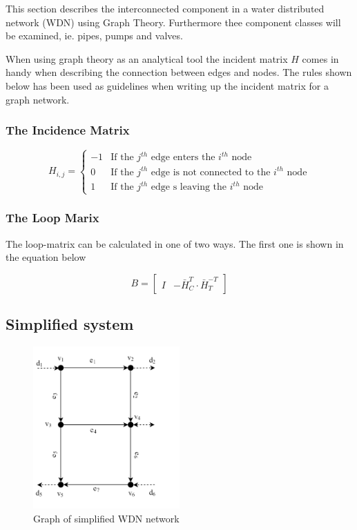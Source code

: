 This section describes the interconnected component in a water distributed network (WDN) using Graph Theory. Furthermore thee component classes will be examined, ie. pipes, pumps and valves.

When using graph theory as an analytical tool the incident matrix $H$ comes in handy when describing the connection between edges and nodes. The rules shown below has been used as guidelines when writing up the incident matrix for a graph network. 

\subsubsection{The Incidence Matrix}
\begin{equation*}
	H_{i,j} = \begin{cases}
		-1 & \text{If the $j^{th}$ edge enters the $i^{th}$ node} \\
		0 & \text{If the $j^{th}$ edge is not connected to the $i^{th}$ node} \\
		1 & \text{If the $j^{th}$ edge s leaving the $i^{th}$ node}
	\end{cases}
\end{equation*} %

\subsubsection{The Loop Marix}
The loop-matrix can be calculated in one of two ways. The first one is shown in the equation below

\begin{equation} \label{eq:LoopMatrix}
	B = \begin{bmatrix}
		I & -\bar{H}_{C}^{T}\cdot\bar{H}_{T}^{-T}
	\end{bmatrix}
\end{equation}


\newpage
\subsection{Simplified system}
\begin{figure}[h!]
	\centering
	\includegraphics[width=0.5\textwidth]{Pictures/Graph.png}
	\caption{Graph of simplified WDN network \cite{Rathore930}}
	\label{fig:graph}
\end{figure}

